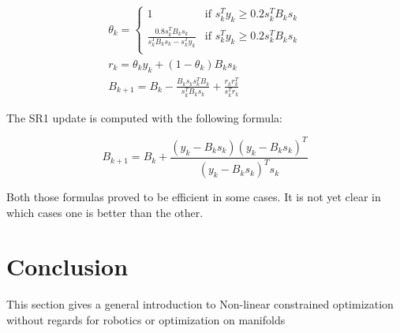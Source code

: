 \begin{equation}
  \label{damped_BFGS}
\begin{split}
  \theta_k =
  \left\{
      \begin{array}{ll}
      1 & \text{if } s_k^Ty_k \geq 0.2s_k^TB_ks_k \\
      \frac{0.8s_k^TB_ks_k}{s_k^TB_ks_k-s_k^Ty_k} & \text{if } s_k^Ty_k \geq 0.2s_k^TB_ks_k \\
      \end{array}
      \right.\\
      r_k = \theta_k y_k + (1-\theta_k)B_ks_k\\
      B_{k+1} = B_k - \frac{B_k s_k s_k^T B_k}{s_k^T B_k s_k} + \frac{r_k r_k^T}{s_k^T r_k}
\end{split}
\end{equation}

The SR1 update is computed with the following formula:

\begin{equation}
  \label{SR1}
  B_{k+1} = B_k + \frac{(y_k-B_ks_k)(y_k-B_ks_k)^T}{(y_k-B_ks_k)^Ts_k}
\end{equation}

Both those formulas proved to be efficient in some cases. It is not yet clear in which cases one is better than the other.

\section{Conclusion}
This section gives a general introduction to Non-linear constrained optimization without regards for robotics or optimization on manifolds


